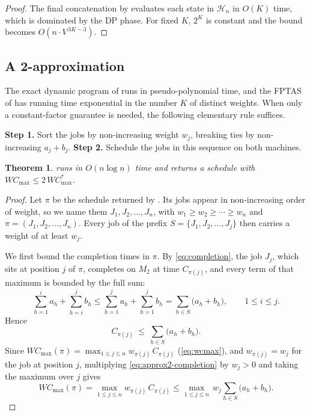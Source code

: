 ﻿\documentclass[12pt]{article}
\newtheorem{theorem}{Theorem}[section]
\begin{document}
\begin{sloppypar}
\begin{proof}
The final concatenation by  evaluates each state in
$\mathscr{H}_{n}$ in $O(K)$ time, which is dominated by the DP phase. For fixed $K$, $2^K$ is
constant and the bound becomes $O(n \cdot V^{\,3K-3})$.
\end{proof}

\subsection{A 2-approximation}
\label{sub:approx2}

The exact dynamic program of  runs in pseudo-polynomial
time, and the FPTAS of  has running time exponential in the
number $K$ of distinct weights. When only a constant-factor guarantee is needed, the
following elementary rule suffices.

\begin{algorithm}[H]
\small
\linespread{1.2}\selectfont
\SetAlgoLined
\DontPrintSemicolon
\caption{2-Approximation for $F2 \parallel WC_{\max}$}\label{alg:approx2}
\BlankLine
\textbf{Step 1.} Sort the jobs by non-increasing weight $w_j$, breaking ties by non-increasing
$a_j+b_j$. \;
\textbf{Step 2.} Schedule the jobs in this sequence on both machines. \;
\end{algorithm}

\begin{theorem}\label{thm:approx2}
 runs in $O(n\log n)$ time and returns a schedule with
$W C_{\max}\le 2\,W C_{\max}^{*}$.
\end{theorem}

\begin{proof}
Let $\pi$ be the schedule returned by . Its jobs appear in non-increasing
order of weight, so we name them $J_1,J_2,\dots,J_n$, with $w_1\ge w_2\ge\cdots\ge w_n$ and
$\pi=(J_1,J_2,\dots,J_n)$. Every job of the prefix $S=\{J_1,J_2,\dots,J_j\}$ then carries
a weight of at least $w_j$.

We first bound the completion times in $\pi$. By \cref{eq:completion}, the job $J_j$, which
sits at position $j$ of $\pi$, completes on $M_2$ at time $C_{\pi(j)}$, and every term of that
maximum is bounded by the
full sum:
\[
\sum_{h=1}^{i}a_h+\sum_{h=i}^{j}b_h
\le \sum_{h=1}^{j}a_h+\sum_{h=1}^{j}b_h
= \sum_{h\in S}\bigl(a_h+b_h\bigr),
\qquad 1\le i\le j.
\]
Hence
\begin{equation}\label{eq:approx2-completion}
C_{\pi(j)}\ \le\ \sum_{h\in S}\bigl(a_h+b_h\bigr).
\end{equation}
Since $W C_{\max}(\pi)=\max_{1\le j\le n}w_{\pi(j)}\,C_{\pi(j)}$ (\cref{eq:wcmax}), and
$w_{\pi(j)}=w_j$ for the job at position $j$, multiplying \cref{eq:approx2-completion}
by $w_j>0$ and taking the maximum over $j$ gives
\begin{equation}\label{eq:approx2-upper}
W C_{\max}(\pi)=\max_{1\le j\le n}w_{\pi(j)}\,C_{\pi(j)}
\le \max_{1\le j\le n}\,w_j\sum_{h\in S}\bigl(a_h+b_h\bigr).
\end{equation}


\end{proof}
\end{sloppypar}
\end{document}
